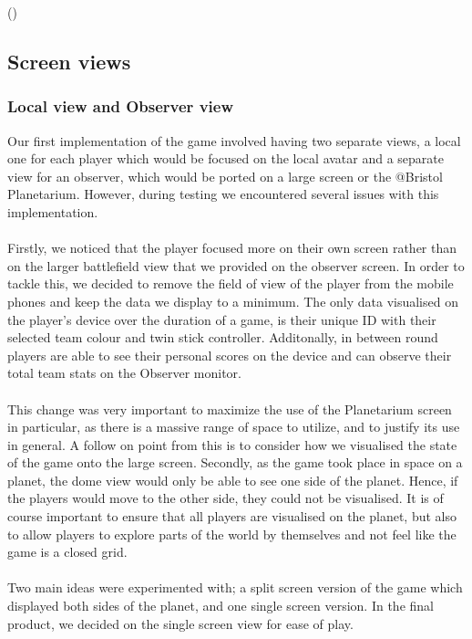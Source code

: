 \documentclass[11pt,a4paper]{article}
\begin{document}
  \begin{algorithm}[H]
    \LinesNumbered
    \Fn(){}{
    }
  \end{algorithm}

  \pagebreak
  \subsection{Screen views}


   \subsubsection{Local view and Observer view}

   Our first implementation of the game involved having two separate views, a local one for each player which would be focused on the local avatar and a separate view for an observer, which would be ported on a large screen or the @Bristol Planetarium. However, during testing we encountered several issues with this implementation. \\ \\
   Firstly, we noticed that the player focused more on their own screen rather than on the larger battlefield view that we provided on the observer screen. In order to tackle this, we decided to remove the field of view of the player from the mobile phones and keep the data we display to a minimum. The only data visualised on the player’s device over the duration of a game, is their unique ID with their selected team colour and twin stick controller. Additonally, in between round players are able to see their personal scores on the device and can observe their total team stats on the Observer monitor. \\ \\
   This change was very important to maximize the use of the Planetarium screen in particular, as there is a massive range of space to utilize, and to justify its use in general. A follow on point from this is to consider how we visualised the state of the game onto the large screen. 
   Secondly, as the game took place in space on a planet, the dome view would only be able to see one side of the planet. Hence, if the players would move to the other side, they could not be visualised. It is of course important to ensure that all players are visualised on the planet, but also to allow players to explore parts of the world by themselves and not feel like the game is a closed grid. \\ \\  
   Two main ideas were experimented with; a split screen version of the game which displayed both sides of the planet, and one single screen version. In the final product, we decided on the single screen view for ease of play.
\end{document}
